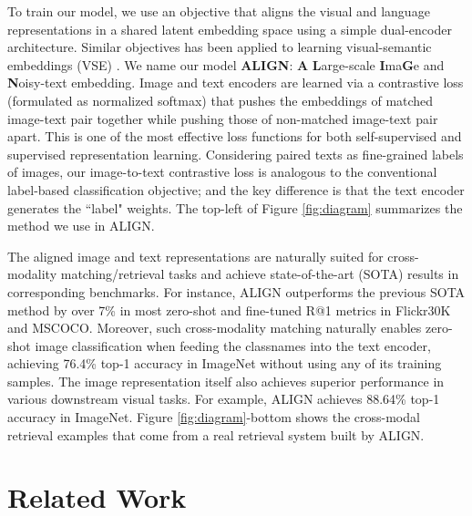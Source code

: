 \documentclass{article}
\begin{document}
To train our model, we use an objective that aligns the visual and language representations in a shared latent embedding space using a simple dual-encoder architecture. Similar objectives has been applied to learning visual-semantic embeddings (VSE) \cite{frome:devise, faghri:vse++}. We name our model \textbf{ALIGN}: \textbf{A} \textbf{L}arge-scale \textbf{I}ma\textbf{G}e and \textbf{N}oisy-text embedding. Image and text encoders are learned via a contrastive loss (formulated as normalized softmax) that pushes the embeddings of matched image-text pair together while pushing those of non-matched image-text pair apart. This is one of the most effective loss functions for both self-supervised \cite{chen:simclr} and supervised \cite{zhai:norm_softmax, musgrave:metric_check} representation learning. Considering paired texts as fine-grained labels of images, our image-to-text contrastive loss is analogous to the conventional label-based classification objective; and the key difference is that the text encoder generates the ``label" weights. The top-left of Figure \ref{fig:diagram} summarizes the method we use in ALIGN.

The aligned image and text representations are naturally suited for cross-modality matching/retrieval tasks and achieve state-of-the-art (SOTA) results in corresponding benchmarks. For instance, ALIGN outperforms the previous SOTA method by over 7\% in most zero-shot and fine-tuned R@1 metrics in Flickr30K and MSCOCO. Moreover, such cross-modality matching naturally enables zero-shot image classification when feeding the classnames into the text encoder, achieving 76.4\% top-1 accuracy in ImageNet without using any of its training samples. The image representation itself also achieves superior performance in various downstream visual tasks. For example, ALIGN achieves 88.64\% top-1 accuracy in ImageNet.  Figure \ref{fig:diagram}-bottom shows the cross-modal retrieval examples that come from a real retrieval system built by ALIGN.

\vspace{-2mm}
\section{Related Work}
\end{document}
